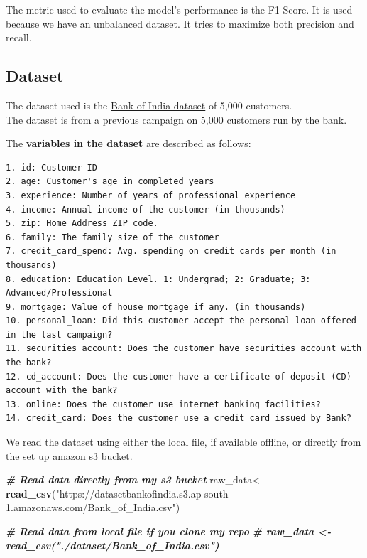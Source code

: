 \documentclass[
]{article}
\newenvironment{Shaded}{\begin{snugshade}}{\end{snugshade}}
\newcommand{\CommentTok}[1]{\textcolor[rgb]{0.00,0.40,1.00}{\textbf{\textit{#1}}}}
\newcommand{\KeywordTok}[1]{\textcolor[rgb]{0.26,0.66,0.93}{\textbf{#1}}}
\newcommand{\NormalTok}[1]{\textcolor[rgb]{0.74,0.68,0.62}{#1}}
\newcommand{\StringTok}[1]{\textcolor[rgb]{0.02,0.61,0.04}{#1}}
\begin{document}
The metric used to evaluate the model's performance is the F1-Score. It
is used because we have an unbalanced dataset. It tries to maximize both
precision and recall.

\hypertarget{dataset}{%
\subsection{Dataset}\label{dataset}}

The dataset used is the
\href{https://datasetbankofindia.s3.ap-south-1.amazonaws.com/Bank_of_India.csv}{Bank
of India dataset} of 5,000 customers.\\
The dataset is from a previous campaign on 5,000 customers run by the
bank.

The \textbf{variables in the dataset} are described as follows:

\begin{verbatim}
1. id: Customer ID
2. age: Customer's age in completed years
3. experience: Number of years of professional experience
4. income: Annual income of the customer (in thousands)
5. zip: Home Address ZIP code.
6. family: The family size of the customer
7. credit_card_spend: Avg. spending on credit cards per month (in thousands)
8. education: Education Level. 1: Undergrad; 2: Graduate; 3: Advanced/Professional
9. mortgage: Value of house mortgage if any. (in thousands)
10. personal_loan: Did this customer accept the personal loan offered in the last campaign?
11. securities_account: Does the customer have securities account with the bank?
12. cd_account: Does the customer have a certificate of deposit (CD) account with the bank?
13. online: Does the customer use internet banking facilities?
14. credit_card: Does the customer use a credit card issued by Bank?
\end{verbatim}

We read the dataset using either the local file, if available offline,
or directly from the set up amazon s3 bucket.

\begin{Shaded}
\begin{Highlighting}[]
\CommentTok{# Read data directly from my s3 bucket}
\NormalTok{raw_data<-}\KeywordTok{read_csv}\NormalTok{(}\StringTok{"https://datasetbankofindia.s3.ap-south-1.amazonaws.com/Bank_of_India.csv"}\NormalTok{)}

\CommentTok{# Read data from local file if you clone my repo}
\CommentTok{# raw_data <- read_csv("./dataset/Bank_of_India.csv")}
\end{Highlighting}
\end{Shaded}
\end{document}
